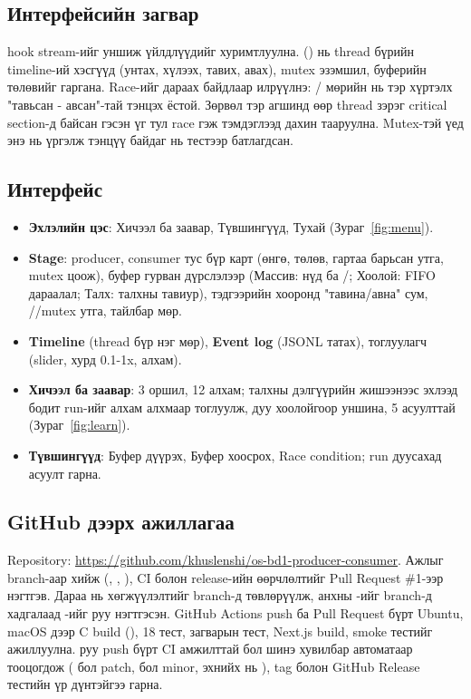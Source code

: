\documentclass[12pt,a4paper]{article}
\newcommand{\Repo}{https://github.com/khuslenshi/os-bd1-producer-consumer}
\begin{document}
\subsection{Интерфейсийн загвар}
 hook stream-ийг уншиж үйлдлүүдийг хуримтлуулна.  () нь thread бүрийн timeline-ий хэсгүүд (унтах, хүлээх, тавих, авах), mutex эзэмшил, буферийн төлөвийг гаргана. Race-ийг дараах байдлаар илрүүлнэ: / мөрийн  нь тэр хүртэлх "тавьсан - авсан"-тай тэнцэх ёстой. Зөрвөл тэр агшинд өөр thread зэрэг critical section-д байсан гэсэн үг тул race гэж тэмдэглээд дахин тааруулна. Mutex-тэй үед энэ нь үргэлж тэнцүү байдаг нь тестээр батлагдсан.

\subsection{Интерфейс}
\begin{itemize}
  \item \textbf{Эхлэлийн цэс}: Хичээл ба заавар, Түвшингүүд, Тухай (Зураг~\ref{fig:menu}).
  \item \textbf{Stage}: producer, consumer тус бүр карт (өнгө, төлөв, гартаа барьсан утга, mutex цоож), буфер гурван дүрслэлээр (Массив: нүд ба /; Хоолой: FIFO дараалал; Талх: талхны тавиур), тэдгээрийн хооронд "тавина/авна" сум, //mutex утга, тайлбар мөр.
  \item \textbf{Timeline} (thread бүр нэг мөр), \textbf{Event log} (JSONL татах), тоглуулагч (slider, хурд 0.1-1x, алхам).
  \item \textbf{Хичээл ба заавар}: 3 оршил, 12 алхам; талхны дэлгүүрийн жишээнээс эхлээд бодит run-ийг алхам алхмаар тоглуулж, дуу хоолойгоор уншина, 5 асуулттай (Зураг~\ref{fig:learn}).
  \item \textbf{Түвшингүүд}: Буфер дүүрэх, Буфер хоосрох, Race condition; run дуусахад асуулт гарна.
\end{itemize}


\subsection{GitHub дээрх ажиллагаа}
Repository: \url{\Repo}. Ажлыг branch-аар хийж (, , ), CI болон release-ийн өөрчлөлтийг Pull Request \#1-ээр нэгтгэв. Дараа нь хөгжүүлэлтийг  branch-д төвлөрүүлж, анхны -ийг  branch-д хадгалаад -ийг  руу нэгтгэсэн. GitHub Actions push ба Pull Request бүрт Ubuntu, macOS дээр C build (), 18 тест, загварын тест, Next.js build,  smoke тестийг ажиллуулна.  руу push бүрт CI амжилттай бол шинэ хувилбар автоматаар тооцогдож ( бол patch,  бол minor, эхнийх нь ), tag болон GitHub Release тестийн үр дүнтэйгээ гарна.
\end{document}
